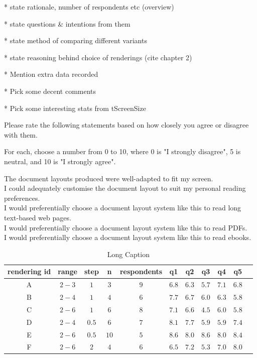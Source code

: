 * state rationale, number of respondents etc (overview)

* state questions \& intentions from them

* state method of comparing different variants

* state reasoning behind choice of renderings (cite chapter 2)

* Mention extra data recorded

* Pick some decent comments

* Pick some interesting stats from tScreenSize

Please rate the following statements based on how closely you agree or disagree with them.

For each, choose a number from 0 to 10, where 0 is "I strongly disagree", 5 is neutral, and 10 is "I strongly agree".

The document layouts produced were well-adapted to fit my screen.\\
I could adequately customise the document layout to suit my personal reading preferences.\\
I would preferentially choose a document layout system like this to read long text-based web pages.\\
I would preferentially choose a document layout system like this to read PDFs.\\
I would preferentially choose a document layout system like this to read ebooks.\\


\begin{table}
  \footnotesize
  \myfloatalign
  \begin{tabular}{ccccccccccc}
    \toprule
    rendering id & range & step & n & respondents & q1 & q2 & q3 & q4 & q5 \\
    \midrule
    A & $2-3$ & $1$   & $3$  & $9$ & $6.8$ & $6.3$ & $5.7$ & $7.1$ & $6.8$ \\
    B & $2-4$ & $1$   & $4$  & $6$ & $7.7$ & $6.7$ & $6.0$ & $6.3$ & $5.8$ \\
    C & $2-6$ & $1$   & $6$  & $8$ & $7.1$ & $6.6$ & $4.5$ & $6.0$ & $5.8$ \\
    D & $2-4$ & $0.5$ & $6$  & $7$ & $8.1$ & $7.7$ & $5.9$ & $5.9$ & $7.4$ \\
    E & $2-6$ & $0.5$ & $10$ & $5$ & $8.6$ & $8.0$ & $8.6$ & $8.0$ & $8.4$ \\
    F & $2-6$ & $2$   & $4$  & $6$ & $6.5$ & $7.2$ & $5.3$ & $7.0$ & $8.0$ \\
    \bottomrule
\end{tabular}
  \caption[Short Caption]{Long Caption}
  \label{tab:studyavgs}
\end{table}

